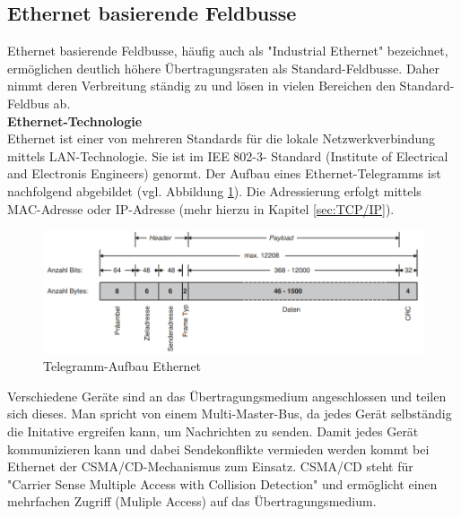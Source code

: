 \documentclass[ a4paper,
                oneside,
                toc=bibliography,
                toc=listof
                ]{scrbook}
\begin{document}
	\subsection{Ethernet basierende Feldbusse}
	Ethernet basierende Feldbusse, häufig auch als "Industrial Ethernet" bezeichnet, ermöglichen deutlich höhere Übertragungsraten als Standard-Feldbusse. Daher nimmt deren Verbreitung ständig zu und lösen in vielen Bereichen den Standard-Feldbus ab. \cite{hering2012elektrotechnik}\\
	\textbf{Ethernet-Technologie}\\
	Ethernet ist einer von mehreren Standards für die lokale Netzwerkverbindung mittels LAN-Technologie. Sie ist im IEE 802-3- Standard (Institute of Electrical and Electronis Engineers) genormt. Der Aufbau eines Ethernet-Telegramms ist nachfolgend abgebildet (vgl. Abbildung \ref{fig:EthernetTelegramm}). Die Adressierung erfolgt mittels MAC-Adresse oder IP-Adresse (mehr hierzu in Kapitel \ref{sec:TCP/IP}). \cite{riggert2002rechnernetze}\\
	\begin{figure}[!ht]
		\centering
		\includegraphics[width=1.0\linewidth]{./images/Ethernet-Telegram.png}
		\caption{Telegramm-Aufbau Ethernet \cite{hering2012elektrotechnik}}
		\label{fig:EthernetTelegramm}
	\end{figure}
	Verschiedene Geräte sind an das Übertragungsmedium angeschlossen und teilen sich dieses. Man spricht von einem Multi-Master-Bus, da jedes Gerät selbständig die Initative ergreifen kann, um Nachrichten zu senden. Damit jedes Gerät kommunizieren kann und dabei Sendekonflikte vermieden werden kommt bei Ethernet der CSMA/CD-Mechanismus zum Einsatz. CSMA/CD steht für "Carrier Sense Multiple Access with Collision Detection" und ermöglicht einen mehrfachen Zugriff (Muliple Access) auf das Übertragungsmedium. \cite{hering2012elektrotechnik} \cite{riggert2002rechnernetze}
\end{document}

